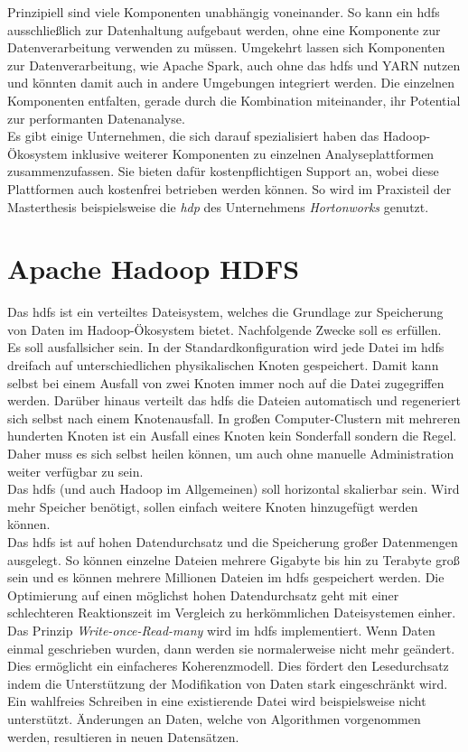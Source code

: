 \noindent
Prinzipiell sind viele Komponenten unabhängig voneinander. So kann ein \gls{hdfs} ausschließlich zur Datenhaltung aufgebaut werden, ohne eine Komponente zur Datenverarbeitung verwenden zu müssen. Umgekehrt lassen sich Komponenten zur Datenverarbeitung, wie Apache Spark, auch ohne das \gls{hdfs} und YARN nutzen und könnten damit auch in andere Umgebungen integriert werden. Die einzelnen Komponenten entfalten, gerade durch die Kombination miteinander, ihr Potential zur performanten Datenanalyse.\\

\noindent
Es gibt einige Unternehmen, die sich darauf spezialisiert haben das Hadoop-Ökosystem inklusive weiterer Komponenten zu einzelnen Analyseplattformen zusammenzufassen. Sie bieten dafür kostenpflichtigen Support an, wobei diese Plattformen auch kostenfrei betrieben werden können. So wird im Praxisteil der Masterthesis beispielsweise die \textit{\gls{hdp}} des Unternehmens \textit{Hortonworks} genutzt.


\section{Apache Hadoop HDFS}
\label{sec:theory_hdfs}
Das \acrfull{hdfs} ist ein verteiltes Dateisystem, welches die Grundlage zur Speicherung von Daten im Hadoop-Ökosystem bietet. Nachfolgende Zwecke soll es erfüllen.\\
Es soll ausfallsicher sein. In der Standardkonfiguration wird jede Datei im \gls{hdfs} dreifach auf unterschiedlichen physikalischen Knoten gespeichert. Damit kann selbst bei einem Ausfall von zwei Knoten immer noch auf die Datei zugegriffen werden. Darüber hinaus verteilt das \gls{hdfs} die Dateien automatisch und regeneriert sich selbst nach einem Knotenausfall. In großen Computer-Clustern mit mehreren hunderten Knoten ist ein Ausfall eines Knoten kein Sonderfall sondern die Regel. Daher muss es sich selbst heilen können, um auch ohne manuelle Administration weiter verfügbar zu sein.\\
Das \gls{hdfs} (und auch Hadoop im Allgemeinen) soll horizontal skalierbar sein. Wird mehr Speicher benötigt, sollen einfach weitere Knoten hinzugefügt werden können.\\
Das \gls{hdfs} ist auf hohen Datendurchsatz und die Speicherung großer Datenmengen ausgelegt.
So können einzelne Dateien mehrere Gigabyte bis hin zu Terabyte groß sein und es können mehrere Millionen Dateien im \gls{hdfs} gespeichert werden. Die Optimierung auf einen möglichst hohen Datendurchsatz geht mit einer schlechteren Reaktionszeit im Vergleich zu herkömmlichen Dateisystemen einher.\\
Das Prinzip \textit{Write-once-Read-many} wird im \gls{hdfs} implementiert. Wenn Daten einmal geschrieben wurden, dann werden sie normalerweise nicht mehr geändert. Dies ermöglicht ein einfacheres Koherenzmodell. Dies fördert den Lesedurchsatz indem die Unterstützung der Modifikation von Daten stark eingeschränkt wird. Ein wahlfreies Schreiben in eine existierende Datei wird beispielsweise nicht unterstützt. Änderungen an Daten, welche von Algorithmen vorgenommen werden, resultieren in neuen Datensätzen.\\

